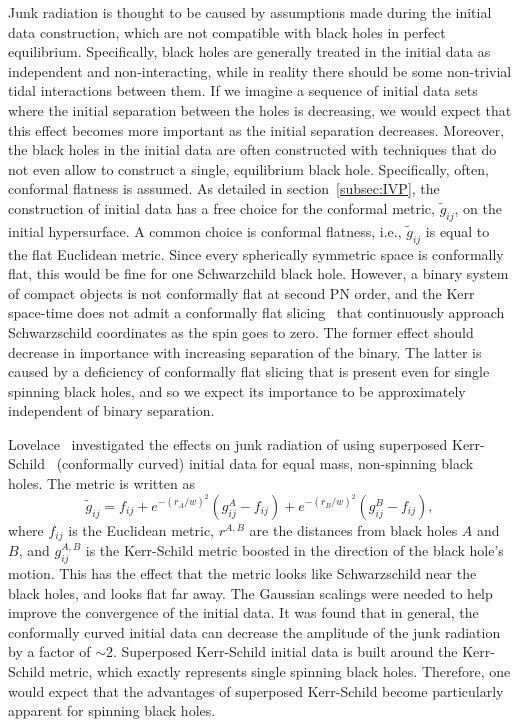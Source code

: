 \documentclass[aps,prd,amsmath,floatfix,twocolumn,superscriptaddress,nofootinbib,showpacs]{revtex4-1}
\theoremstyle{plain}
\theoremstyle{definition}
\begin{document}
Junk radiation is thought to be caused by assumptions made during the
initial data construction, which are not compatible with black holes in perfect equilibrium. Specifically,
 black holes are generally treated in the
initial data as independent and non-interacting, while in reality
there should be some non-trivial tidal interactions between them. If
we imagine a sequence of initial data sets where the initial
separation between the holes is decreasing, we would expect that this
effect becomes more important as the initial separation decreases. 
Moreover, the black holes in the initial data are often constructed
with techniques that do not even allow to construct a single, equilibrium black  hole.  Specifically, often, conformal flatness is assumed. As detailed in section~\ref{subsec:IVP}, the construction of initial data has a
free choice for the conformal metric, $\tilde{g}_{ij}$, on the initial
hypersurface. A common choice is conformal flatness, i.e.,
$\tilde{g}_{ij}$ is equal to the flat Euclidean metric. Since every
spherically symmetric space is conformally flat, this would be fine
for one Schwarzchild black hole. However,  a
binary system of compact objects is not conformally flat at second PN
order\cite{Rieth:1997}, and the Kerr space-time does not admit a
conformally flat slicing~\cite{GaratPrice:2000} that continuously approach Schwarzschild coordinates as the spin goes to zero. 
The former effect should decrease in importance with increasing separation of the binary.  The latter is caused by a deficiency of conformally flat slicing that is present even for single spinning black holes, and so we expect its importance
to be approximately independent of binary separation.

Lovelace~\cite{Lovelace2009} investigated the effects on junk radiation of using
superposed Kerr-Schild~\cite{Matzner1999,Marronetti-Matzner:2000,Pfeiffer2002a,Lovelace2008} (conformally curved) initial data for equal mass, non-spinning black
holes.  The metric is written as
\begin{equation}
\tilde{g}_{ij}=f_{ij}+e^{-(r_A/w)^2}\left(g_{ij}^A-f_{ij}\right)+e^{-(r_B/w)^2}\left(g_{ij}^B-f_{ij}\right),
\end{equation}
where $f_{ij}$ is the Euclidean metric, $r^{A,B}$ are the distances
from black holes $A$ and $B$, and $g_{ij}^{A,B}$ is the Kerr-Schild metric boosted in
the direction of the black hole's motion. This has the effect that the
metric looks like Schwarzschild near the black holes, and looks flat
far away. The Gaussian scalings were needed to help improve the
convergence of the initial data. It was found that in general, the
conformally curved initial data can decrease the amplitude of the junk
radiation by a factor of $\sim 2$.
Superposed Kerr-Schild initial data is built around the
  Kerr-Schild metric, which exactly represents single spinning black holes.
 Therefore, one would expect that the advantages of superposed Kerr-Schild become particularly apparent for spinning black holes.
\end{document}
